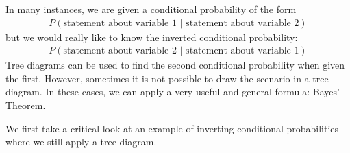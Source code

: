 
In many instances, we are given a conditional probability of the form
\begin{align*}
P(\text{statement about variable 1 } | \text{ statement about variable 2})
\end{align*}
but we would really like to know the inverted conditional probability:
\begin{align*}
P(\text{statement about variable 2 } | \text{ statement about variable 1})
\end{align*}
Tree diagrams can be used to find the second conditional probability when given the first. However, sometimes it is not possible to draw the scenario in a tree diagram. In these cases, we can apply a very useful and general formula: Bayes' Theorem.

We first take a critical look at an example of inverting conditional probabilities where we still apply a tree diagram.

\D{\newpage}

